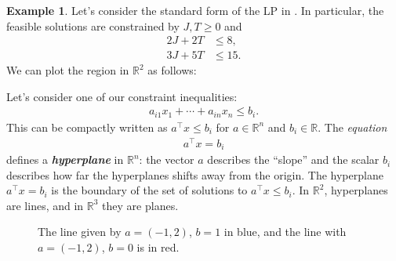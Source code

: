 \documentclass[a4paper, 12pt]{article}
\numberwithin{equation}{section}
\numberwithin{figure}{section}
\theoremstyle{definition}
\newtheorem{ex}[thm]{Example}
\renewcommand{\leq}{\leqslant}
\renewcommand{\geq}{\geqslant}
\newcommand{\R}{\mathbb{R}}
\newcommand{\define}[1]{\textbf{\textit{#1}}}
\begin{document}
\begin{ex}\label{ex:sewing-feasible}
	Let's consider the standard form of the LP in . In
	particular, the feasible solutions are constrained by $J,T \geq 0$ and 
	\begin{align*}
		2J + 2T &\leq 8, \\
		3J + 5T &\leq 15.
	\end{align*}
	We can plot the region in $\R^2$ as follows:
	\begin{center}
	\end{center}
\end{ex}

Let's consider one of our constraint inequalities:
\begin{align*}
	a_{i1}x_1 + \cdots + a_{in}x_n \leq b_i.
\end{align*}
This can be compactly written as $a^{\top}x \leq b_i$ for $a\in\R^n$ and $b_i\in
\R$. The \emph{equation} 
\begin{align*}
	a^{\top}x = b_i 
\end{align*}
defines a \define{hyperplane} in $\R^n$: the vector $a$ describes the ``slope''
and the scalar $b_i$ describes how far the hyperplanes shifts away from the
origin. The hyperplane $a^{\top}x = b_i$ is the boundary of the set of solutions
to $a^{\top}x \leq b_i$. In $\R^2$, hyperplanes are lines, and in $\R^3$ they
are planes. 

\begin{figure}[h]
	\centering 
	\caption{The line given by $a = (-1, 2)$, $b=1$ in blue, and the line with $a = (-1, 2)$, $b=0$ is in red.}
\end{figure}
\end{document}
